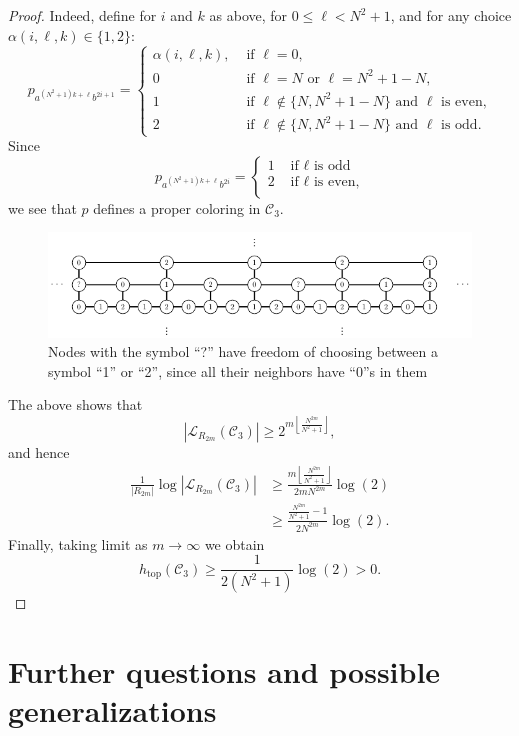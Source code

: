 \documentclass[letterpaper,11pt,reqno]{amsart}
\theoremstyle{plain}
\theoremstyle{definition}
\theoremstyle{cupremark}
\def\htop{h_{\mathrm{top}}}
\begin{document}
\begin{proof}
	Indeed, define for $i$ and $k$ as above, for $0\le \ell <N^2+1$, and for any choice $\alpha(i,\ell,k)\in\{1,2\}$:
	$$
	p_{a^{(N^2+1)k+\ell}b^{2i+1}}=\begin{cases}
	\alpha(i,\ell,k), &\text{ if }\ell=0,\\
	0 \ &\text{ if } \ell=N \text{ or }\ell=N^2+1-N,\\
	1\ &\text{ if } \ell\notin\{N,N^2+1-N\} \text{ and }\ell \text{ is even,}\\
	2\ &\text{ if } \ell\notin\{N,N^2+1-N\} \text{ and }\ell \text{ is odd}.
	\end{cases}
	$$
	Since $$p_{a^{(N^2+1)k+\ell}b^{2i}}=\begin{cases}
	1 &\text{ if }\ell \text{ is odd}\\
	2 &\text{ if }\ell \text{ is even,}\\
	\end{cases}$$
	we see that $p$ defines a proper coloring in $\mathcal{C}_3$.
	
	
	\begin{figure}
		\centering
		\includegraphics[]{freespace_entropy.pdf}
		\caption{Nodes with the symbol ``?'' have freedom of choosing between a symbol ``1'' or ``2'', since all their neighbors have ``0''s in them}
	\end{figure}
	
	The above shows that
	$$
	|\mathcal{L}_{R_{2m}}(\mathcal{C}_3)|\ge 2^{m\left\lfloor \frac{N^{2m}}{N^2+1}\right\rfloor },
	$$
	and hence
	\begin{align*}
	\frac{1}{|R_{2m}|}\log |\mathcal{L}_{R_{2m}}(\mathcal{C}_3)|&\ge\frac{m\left\lfloor \frac{N^{2m}}{N^2+1}\right\rfloor}{2mN^{2m}}\log(2) \\
	&\ge \frac{\frac{N^{2m}}{N^2+1}-1}{2N^{2m}}\log(2).
	\end{align*}
	Finally, taking limit as $m\to\infty$ we obtain
	$$
	\htop(\mathcal{C}_3)\ge \frac{1}{2(N^2+1)}\log(2)>0.
	$$
\end{proof}	

\section{Further questions and possible generalizations}
\label{section: further questions}
\end{document}
